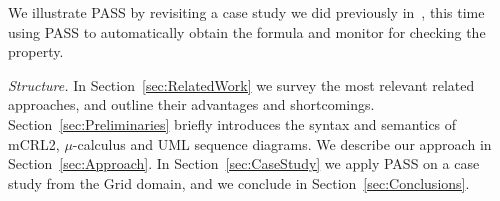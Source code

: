\documentclass[letter]{llncs}
\begin{document}

We illustrate PASS by revisiting a case study we did previously
in~\cite{DBLP:dblp_conf/nfm/RemenskaTWHVCB13}, this time using PASS
to automatically obtain the formula and monitor for checking the
property.\medskip

\noindent\emph{Structure.}
In Section~\ref{sec:RelatedWork} we
 survey the most relevant related approaches,
and outline their advantages and
shortcomings. Section~\ref{sec:Preliminaries} briefly introduces
the syntax and semantics of mCRL2, $\mu$-calculus and UML sequence
diagrams.  We describe our approach in Section~\ref{sec:Approach}.
In Section~\ref{sec:CaseStudy} we apply PASS on a case study from the
Grid domain, and we conclude in Section~\ref{sec:Conclusions}.
\vspace{-7 pt}
\end{document}
